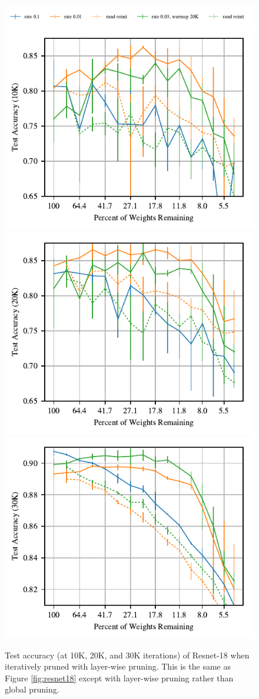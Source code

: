 \begin{figure}
\centering
\vspace{-.5em}
\includegraphics[width=.7\textwidth]{graphs/cifar10/icml/resnet18-iclr-10000lw/legend}%
\vspace{-1em}
\includegraphics[width=.33\textwidth]{graphs/cifar10/icml/resnet18-iclr-10000lw/accuracy}%
\includegraphics[width=.33\textwidth]{graphs/cifar10/icml/resnet18-iclr-20000lw/accuracy}%
\includegraphics[width=.33\textwidth]{graphs/cifar10/icml/resnet18-iclr-29900lw/accuracy}%
\vspace{-1em}
\caption{Test accuracy (at 10K, 20K, and 30K iterations) of Resnet-18 when iteratively pruned with layer-wise pruning. This is the same as Figure \ref{fig:resnet18} except with layer-wise pruning rather than global pruning.}
\label{fig:resnet18lw}
\end{figure}

